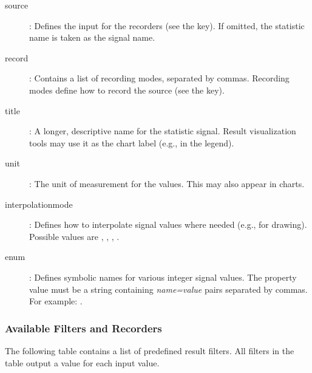 \begin{description}
  \item[source]: Defines the input for the recorders (see the  key).
     If omitted, the statistic name is taken as the signal name.
  \item[record]: Contains a list of recording modes, separated by commas.
     Recording modes define how to record the source (see the  key).
  \item[title]: A longer, descriptive name for the statistic signal. Result
      visualization tools may use it as the chart label (e.g., in the legend).
  \item[unit]: The unit of measurement for the values. This may also appear in charts.
  \item[interpolationmode]: Defines how to interpolate signal values where
      needed (e.g., for drawing). Possible values are ,
      , , .
  \item[enum]: Defines symbolic names for various integer signal values.
      The property value must be a string containing \textit{name=value} pairs
      separated by commas. For example: .
\end{description}


\subsubsection{Available Filters and Recorders}
\label{sec:simple-modules:available-result-filters-and-recorders}

The following table contains a list of predefined result filters.
All filters in the table output a value for each input value.

